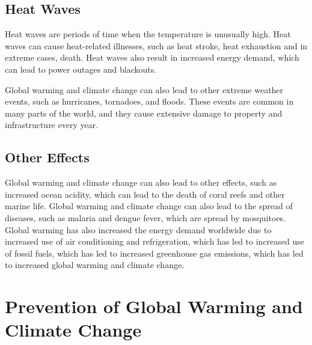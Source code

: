 \documentclass{article}
\begin{document}
\subsection{Heat Waves}
Heat waves are periods of time when the temperature is unusually high. Heat
waves can cause heat-related illnesses, such as heat stroke, heat exhaustion
and in extreme cases, death. Heat waves also result in increased energy demand,
which can lead to power outages and blackouts.

Global warming and climate change can also lead to other extreme weather
events, such as hurricanes, tornadoes, and floods. These events are common in
many parts of the world, and they cause extensive damage to property and
infrastructure every year.

\subsection{Other Effects}
Global warming and climate change can also lead to other effects, such as
increased ocean acidity, which can lead to the death of coral reefs and other
marine life. Global warming and climate change can also lead to the spread of
diseases, such as malaria and dengue fever, which are spread by mosquitoes.
Global warming has also increased the energy demand worldwide due to increased
use of air conditioning and refrigeration, which has led to increased use of
fossil fuels, which has led to increased greenhouse gas emissions, which has
led to increased global warming and climate change.

\section{Prevention of Global Warming and Climate Change}
\begin{figure}[H]
	\centering
	\qquad
	\label{fig:Comparison}
\end{figure}
\end{document}
